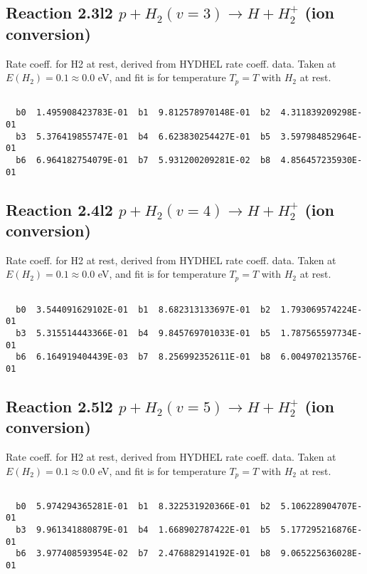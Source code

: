 \newpage
\subsection{
Reaction 2.3l2
$ p + H_2(v=3) \rightarrow H + H_2^+$ (ion conversion)
}
Rate coeff. for H2 at rest, derived from HYDHEL rate coeff. data.
Taken at $E(H_2) = 0.1 \approx 0.0$ eV,  and fit is for temperature $T_p=T$ with $H_2$ at rest.

\begin{small}\begin{verbatim}

  b0  1.495908423783E-01  b1  9.812578970148E-01  b2  4.311839209298E-01
  b3  5.376419855747E-01  b4  6.623830254427E-01  b5  3.597984852964E-01
  b6  6.964182754079E-01  b7  5.931200209281E-02  b8  4.856457235930E-01

\end{verbatim}\end{small}

\newpage
\subsection{
Reaction 2.4l2
$ p + H_2(v=4) \rightarrow H + H_2^+$ (ion conversion)
}
Rate coeff. for H2 at rest, derived from HYDHEL rate coeff. data.
Taken at $E(H_2) = 0.1 \approx 0.0$ eV,  and fit is for temperature $T_p=T$ with $H_2$ at rest.

\begin{small}\begin{verbatim}

  b0  3.544091629102E-01  b1  8.682313133697E-01  b2  1.793069574224E-01
  b3  5.315514443366E-01  b4  9.845769701033E-01  b5  1.787565597734E-01
  b6  6.164919404439E-03  b7  8.256992352611E-01  b8  6.004970213576E-01

\end{verbatim}\end{small}

\newpage
\subsection{
Reaction 2.5l2
$ p + H_2(v=5) \rightarrow H + H_2^+$ (ion conversion)
}
Rate coeff. for H2 at rest, derived from HYDHEL rate coeff. data.
Taken at $E(H_2) = 0.1 \approx 0.0$ eV,  and fit is for temperature $T_p=T$ with $H_2$ at rest.

\begin{small}\begin{verbatim}

  b0  5.974294365281E-01  b1  8.322531920366E-01  b2  5.106228904707E-01
  b3  9.961341880879E-01  b4  1.668902787422E-01  b5  5.177295216876E-01
  b6  3.977408593954E-02  b7  2.476882914192E-01  b8  9.065225636028E-01

\end{verbatim}\end{small}

